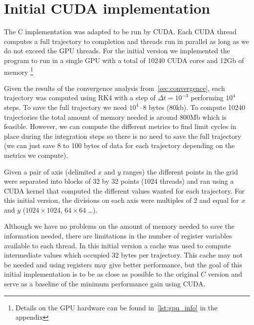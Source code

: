 
\section{Initial CUDA implementation}

The C implementation was adapted to be run by CUDA. Each CUDA thread computes a full trajectory to completion and threads run in parallel as long as we do not
exceed the GPU threads. For the initial version we implemented the program to run in a single GPU with a total of 10240 CUDA cores and 12Gb of memory
\footnote{Details on the GPU hardware can be found in~\cref{lst:gpu_info} in the appendix}

Given the results of the convergence analysis from~\cref{sec:convergence}, each trajectory was computed using RK4 with a step of $\Delta t=10^{-3}$ performing $10^4$ steps. To save the full trajectory we need $10^4\cdot 8$ bytes (80kb). To compute 10240 trajectories the total amount of memory needed is around 800Mb which is feasible. However, we can compute the different metrics to find limit cycles in place during the integration steps so there is no need to save the full trajectory (we can just save 8 to 100 bytes of data for each trajectory depending on the metrics we compute).

Given a pair of axis (delimited $x$ and $y$ ranges) the different points in the grid were separated into blocks of 32 by 32 points (1024 threads) and ran using a CUDA kernel that computed the different values wanted for each trajectory. For this initial version, the divisions on each axis were multiples of 2 and equal for $x$ and $y$ ($1024\times 1024$, $64\times 64$ \dots ).

Although we have no problems on the amount of memory needed to save the information needed, there are limitations in the number of register variables available to each thread. In this initial version a cache was used to compute intermediate values which occupied 32 bytes per trajectory. This cache may not be needed and using registers may give better performance, but the goal of this initial implementation is to be as close as possible to the original $C$ version and serve as a baseline of the minimum performance gain using CUDA.

